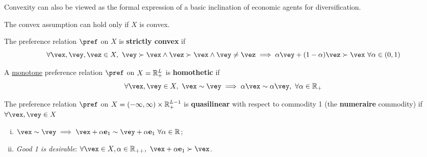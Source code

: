 \documentclass{article}
\begin{document}
 			\begin{remark}
 				Convexity can also be viewed as the formal expression of a basic inclination of economic agents for diversification.
 			\end{remark}
 			
 			\begin{remark}
 				The convex assumption can hold only if $X$ is convex.
 			\end{remark}
 			
 			\begin{definition}[3.B.5]
 				The preference relation $\pref$ on $X$ is \textbf{strictly convex} if
 				\begin{equation}
 					\forall \vex, \vey, \vez \in X,\ \vey \succ \vex \land \vez \succ \vex \land \vey \neq \vez \implies \alpha \vey + (1-\alpha) \vez \succ \vex\ \forall \alpha \in (0, 1)
 				\end{equation}
 			\end{definition}
 			
 			\begin{definition}[3.B.6]
 				A \ul{monotone} preference relation $\pref$ on $X = \mathbb{R}^L_+$ is \textbf{homothetic} if 
 				\begin{equation}
 					\forall \vex, \vey \in X,\ \vex \sim \vey \implies \alpha \vex \sim \alpha \vey,\ \forall \alpha \in \R_+
 				\end{equation}
 			\end{definition}
 			
 			\begin{definition}[3.B.7]
 				The preference relation $\pref$ on $X = (-\infty, \infty) \times \mathbb{R}^{L-1}_+$ is \textbf{quasilinear} with respect to commodity 1 (the \textbf{numeraire} commodity) if $\forall \vex, \vey \in X$
 				\begin{enumerate}[(i)]
 					\item $\vex \sim \vey \implies \vex + \alpha \ve{e}_1 \sim \vey + \alpha \ve{e}_1\ \forall \alpha \in \R$;
 					\item \emph{Good 1 is desirable}: $\forall \vex \in X, \alpha \in \R_{++},\ \vex + \alpha \ve{e}_1 \succ \vex$.
 				\end{enumerate}
 			\end{definition}
\end{document}
